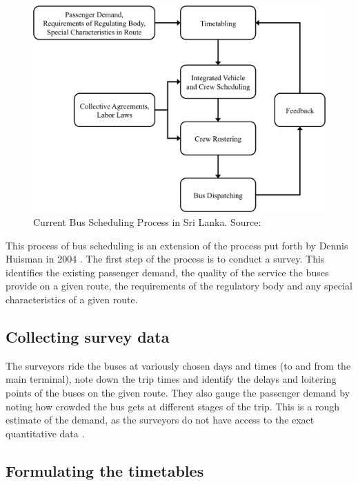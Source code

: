 \begin{figure}[H]
\centering
\includegraphics [scale=0.7] {currentBusSchedulingProcess}
\caption[Current Bus Scheduling Process in SL]{Current Bus Scheduling Process in Sri Lanka. Source: \cite{Piyadasa2005}}
\label{image-currentBusSchedulingProcess}
\end{figure}

This process of bus scheduling is an extension of the process put forth by Dennis Huisman in 2004 \cite{Piyadasa2005}. The first step of the process is to conduct a survey. This identifies the existing passenger demand, the quality of the service the buses provide on a given route, the requirements of the regulatory body and any special characteristics of a given route. 

\subsection{Collecting survey data}

The surveyors ride the buses at variously chosen days and times (to and from the main terminal), note down the trip times and identify the delays and loitering points of the buses on the given route. They also gauge the passenger demand by noting how crowded the bus gets at different stages of the trip. This is a rough estimate of the demand, as the surveyors do not have access to the exact quantitative data \cite{Mahesh2013a, Theja2013a, Mahesh2013b, Navaratne2013a, Navaratne2013b}.

\subsection{Formulating the timetables}

